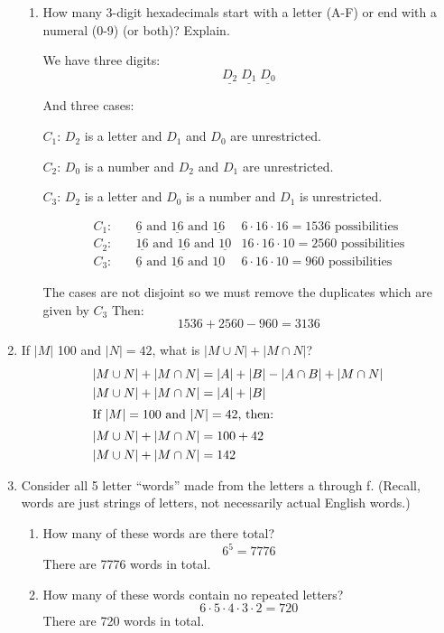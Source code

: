 \documentclass[11pt, letterpaper, includehead]{article}
\theoremstyle{plain}
\theoremstyle{mydefinition}
\theoremstyle{myproperty}
\begin{document}
\begin{enumerate}[label=\textbf{\arabic*}., leftmargin=*]
\begin{enumerate}[label=(\alph*)]
    \item How many 3-digit hexadecimals start with a letter (A-F) or end with a numeral (0-9) (or both)? Explain.
   
    We have three digits: 
    \[
        \underline{D_2} \; \underline{D_1} \; \underline{D_0}
    \]


    And three cases:

    $C_1$: $D_2$ is a letter and $D_1$ and $D_0$ are unrestricted.

    $C_2$: $D_0$ is a number and $D_2$ and $D_1$ are unrestricted.

    $C_3$: $D_2$ is a letter and $D_0$ is a number and $D_1$ is unrestricted.

    \begin{align*}
        C_1: & \quad \underline{6} \text{ and } \underline{16} \text{ and } \underline{16} & 6 \cdot 16 \cdot 16 = 1536 \text{ possibilities}\\
        C_2: & \quad \underline{16} \text{ and } \underline{16} \text{ and } \underline{10} & 16 \cdot 16 \cdot 10 = 2560 \text{ possibilities}\\
        C_3: & \quad \underline{6} \text{ and } \underline{16} \text{ and } \underline{10} & 6 \cdot 16 \cdot 10 = 960 \text{ possibilities}
    \end{align*}

    The cases are not disjoint so we must remove the duplicates which are given by $C_3$
    Then:
    \[1536 + 2560 - 960 = 3136\]


\end{enumerate}

\item If $|M|$ 100 and $|N| = 42$, what is $|M \cup N| + |M \cap N|$?
\begin{align*}
    |M \cup N| + |M \cap N| &= |A| + |B| - |A \cap B| + |M \cap N| \\
    |M \cup N| + |M \cap N| &= |A| + |B| \\
    \intertext{If $|M| = 100$ and $|N| = 42$, then:}
    |M \cup N| + |M \cap N| &= 100 + 42 \\
    |M \cup N| + |M \cap N| &= 142
\end{align*}

\item Consider all 5 letter ``words'' made from the letters a through f. (Recall, words are just strings of letters, not necessarily actual English words.)
\begin{enumerate}[label=(\alph*)]
    \item How many of these words are there total?
    \[
    6^5 = 7776
    \]
    There are 7776 words in total.
    \item How many of these words contain no repeated letters?
    \[
    6 \cdot 5 \cdot 4 \cdot 3 \cdot 2 = 720
    \] 
    There are 720 words in total.


\end{enumerate}
\end{enumerate}
\end{document}
